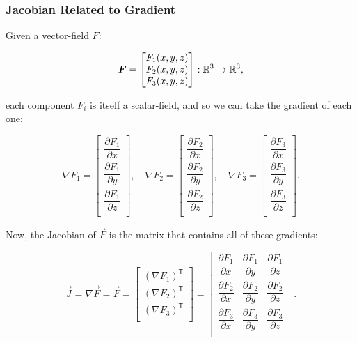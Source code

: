 \documentclass{article}
\begin{document}
\subsubsection{Jacobian Related to Gradient}

\begin{remark}
Given a \@{vector-field} $F:$

\[ \boldsymbol{F} = \begin{bmatrix}
  F_1(x,y,z) \\  
  F_2(x,y,z) \\
  F_3(x,y,z) \\   
\end{bmatrix} : \mathbb{R}^3 \to \mathbb{R}^3, \]

each component $F_i$ is itself a \@{scalar-field}, and so we can take the \@{gradient} of each one:

\[ \nabla F_1 = \begin{bmatrix}
  \dfrac{\partial F_1}{\partial x} \\  
  \dfrac{\partial F_1}{\partial y}  \\
  \dfrac{\partial F_1}{\partial z}  \\   
\end{bmatrix}, \quad
\nabla F_2 = \begin{bmatrix}
  \dfrac{\partial F_2}{\partial x} \\  
  \dfrac{\partial F_2}{\partial y}  \\
  \dfrac{\partial F_2}{\partial z}  \\   
\end{bmatrix}, \quad
\nabla F_3 = \begin{bmatrix}
  \dfrac{\partial F_3}{\partial x} \\  
  \dfrac{\partial F_3}{\partial y}  \\
  \dfrac{\partial F_3}{\partial z}  \\   
\end{bmatrix}. \]

Now, the \@{Jacobian} of $\vec{F}$ is the \@{matrix} that contains all of these \@{gradients}:

\[ \vec{J} = \nabla \vec{F} =  
\vec{F} = \begin{bmatrix}
  (\nabla F_1)^\mathsf{T} \\  
  (\nabla F_2)^\mathsf{T} \\  
  (\nabla F_3)^\mathsf{T} \\  
\end{bmatrix} = 
\begin{bmatrix}
    \dfrac{\partial F_1}{\partial x} & \dfrac{\partial F_1}{\partial y} & \dfrac{\partial F_1}{\partial z}\\
    \dfrac{\partial F_2}{\partial x} & \dfrac{\partial F_2}{\partial y} & \dfrac{\partial F_2}{\partial z}\\
    \dfrac{\partial F_3}{\partial x} & \dfrac{\partial F_3}{\partial y} & \dfrac{\partial F_3}{\partial z}\\
\end{bmatrix}. \]


\end{remark}
\end{document}
